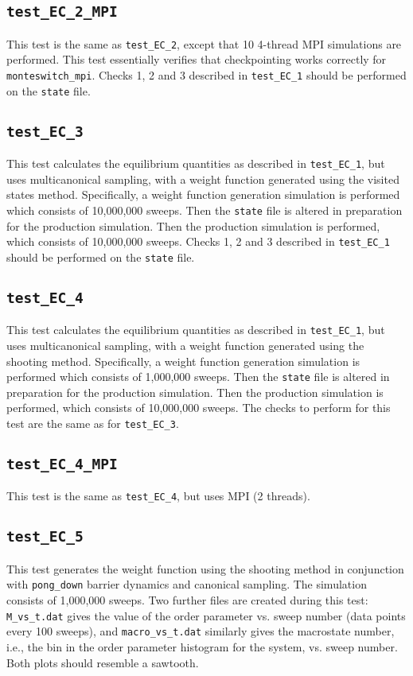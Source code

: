 \documentclass{report}
\begin{document}
\subsection{\texttt{test\_EC\_2\_MPI}}
This test is the same as \texttt{test\_EC\_2}, except that 10 4-thread MPI simulations are performed. This test essentially verifies 
that checkpointing works correctly for \texttt{monteswitch\_mpi}. Checks 1, 2 and 3 described in \texttt{test\_EC\_1} should be 
performed on the \texttt{state} file.


\subsection{\texttt{test\_EC\_3}}
This test calculates the equilibrium quantities as described in \texttt{test\_EC\_1}, but uses multicanonical sampling,
with a weight function generated using the visited states method. Specifically, a weight function generation 
simulation is performed which consists of 10,000,000 sweeps. Then the \texttt{state} file is altered in preparation 
for the production simulation. Then the production simulation is performed, which consists of 10,000,000 sweeps.
Checks 1, 2 and 3 described in \texttt{test\_EC\_1} should be performed on the \texttt{state} file.


\subsection{\texttt{test\_EC\_4}}
This test calculates the equilibrium quantities as described in \texttt{test\_EC\_1}, but uses multicanonical sampling,
with a weight function generated using the shooting method. Specifically, a weight function generation simulation
is performed which consists of 1,000,000 sweeps. Then the \texttt{state} file is altered in preparation 
for the production simulation. Then the production simulation is performed, which consists of 10,000,000 sweeps.
The checks to perform for this test are the same as for \texttt{test\_EC\_3}.


\subsection{\texttt{test\_EC\_4\_MPI}}
This test is the same as \texttt{test\_EC\_4}, but uses MPI (2 threads).


\subsection{\texttt{test\_EC\_5}}
This test generates the weight function using the shooting method in conjunction with \texttt{pong\_down} barrier
dynamics and canonical sampling. The simulation consists of 1,000,000 sweeps. Two further files are created 
during this test: \texttt{M\_vs\_t.dat} gives the value of the order parameter vs. sweep number (data points 
every 100 sweeps), and \texttt{macro\_vs\_t.dat} similarly gives the macrostate number, i.e., the bin in the 
order parameter histogram for the system, vs. sweep number. Both plots should resemble a sawtooth.
\end{document}

